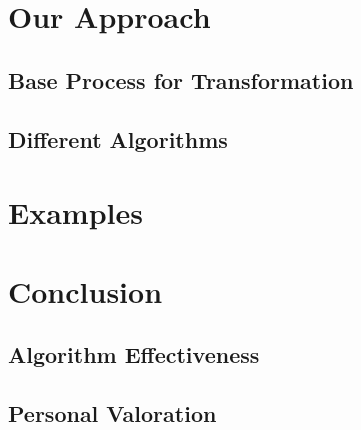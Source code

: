 \documentclass{beamer}
\begin{document}
  \section{Our Approach}
    \subsection{Base Process for Transformation}
    \subsection{Different Algorithms}
  \section{Examples}
  \section{Conclusion}
    \subsection{Algorithm Effectiveness}
    \subsection{Personal Valoration}
\end{document}
